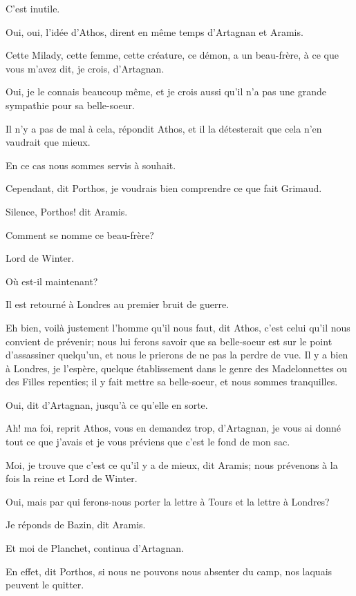 \speak  C'est inutile. 

\speak  Oui, oui, l'idée d'Athos, dirent en même temps d'Artagnan et Aramis. 

\speak  Cette Milady, cette femme, cette créature, ce démon, a un beau-frère, à ce que vous m'avez dit, je crois, d'Artagnan. 

\speak  Oui, je le connais beaucoup même, et je crois aussi qu'il n'a pas une grande sympathie pour sa belle-soeur. 

\speak  Il n'y a pas de mal à cela, répondit Athos, et il la détesterait que cela n'en vaudrait que mieux. 

\speak  En ce cas nous sommes servis à souhait. 

\speak  Cependant, dit Porthos, je voudrais bien comprendre ce que fait Grimaud. 

\speak  Silence, Porthos! dit Aramis. 

\speak  Comment se nomme ce beau-frère? 

\speak  Lord de Winter. 

\speak  Où est-il maintenant? 

\speak  Il est retourné à Londres au premier bruit de guerre. 

\speak  Eh bien, voilà justement l'homme qu'il nous faut, dit Athos, c'est celui qu'il nous convient de prévenir; nous lui ferons savoir que sa belle-soeur est sur le point d'assassiner quelqu'un, et nous le prierons de ne pas la perdre de vue. Il y a bien à Londres, je l'espère, quelque établissement dans le genre des Madelonnettes ou des Filles repenties; il y fait mettre sa belle-soeur, et nous sommes tranquilles. 

\speak  Oui, dit d'Artagnan, jusqu'à ce qu'elle en sorte. 

\speak  Ah! ma foi, reprit Athos, vous en demandez trop, d'Artagnan, je vous ai donné tout ce que j'avais et je vous préviens que c'est le fond de mon sac. 

\speak  Moi, je trouve que c'est ce qu'il y a de mieux, dit Aramis; nous prévenons à la fois la reine et Lord de Winter. 

\speak  Oui, mais par qui ferons-nous porter la lettre à Tours et la lettre à Londres? 

\speak  Je réponds de Bazin, dit Aramis. 

\speak  Et moi de Planchet, continua d'Artagnan. 

\speak  En effet, dit Porthos, si nous ne pouvons nous absenter du camp, nos laquais peuvent le quitter. 

